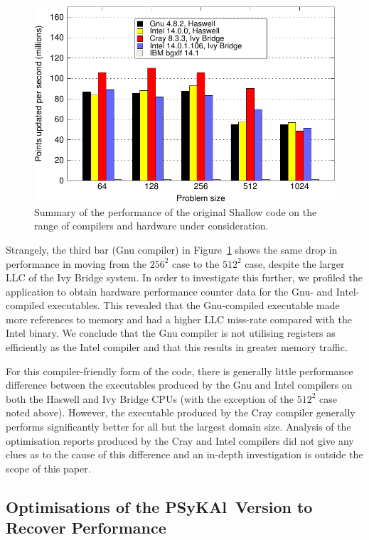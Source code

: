 \documentclass{IOS-Book-Article}
\newcommand{\psykal}{{PS}y{KA}l}
\begin{document}
\begin{figure}[!t]
\centering
\includegraphics[width=120mm]{orig_summary}
\caption{Summary of the performance of the original Shallow code on
  the range of compilers and hardware under consideration.}
\label{FIG_orig_perf_summary}
\end{figure}

Strangely, the third bar (Gnu compiler) in
Figure~\ref{FIG_orig_perf_summary} shows the same drop in performance
in moving from the $256^2$ case to the $512^2$ case, despite the
larger LLC of the Ivy Bridge system. In order to investigate this
further, we profiled the application to obtain hardware performance
counter data for the Gnu- and Intel-compiled executables. This
revealed that the Gnu-compiled executable made more references to
memory and had a higher LLC miss-rate compared with the Intel binary.
We conclude that the Gnu compiler is not utilising registers as
efficiently as the Intel compiler and that this results in greater
memory traffic.

For this compiler-friendly form of the code, there is generally little
performance difference between the executables produced by the Gnu and
Intel compilers on both the Haswell and Ivy Bridge CPUs (with the
exception of the $512^2$ case noted above). However, the executable
produced by the Cray compiler generally performs significantly better
for all but the largest domain size. Analysis of the optimisation
reports produced by the Cray and Intel compilers did not give any
clues as to the cause of this difference and an in-depth investigation
is outside the scope of this paper.

\subsection{Optimisations of the \psykal\ Version to Recover Performance}
\end{document}

